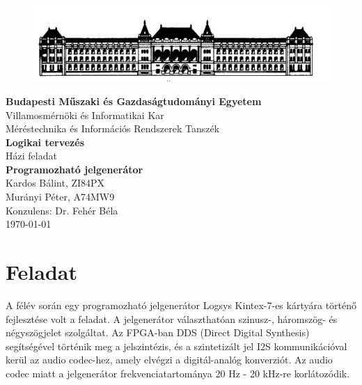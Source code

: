 \documentclass[a4paper,11pt]{article}
\begin{document}
\sloppy

\begin{titlepage}
\begin{center}
\begin{figure}[t!]
	\begin{center}
	\includegraphics[scale=0.2]{bme.png}
	\label{a:bme}
	\end{center}
\end{figure}
\textbf{{Budapesti Műszaki és Gazdaságtudományi Egyetem}}\\
Villamosmérnöki és Informatikai Kar\\
Méréstechnika és Információs Rendszerek Tanszék\\
\vfill
\huge\textbf{{Logikai tervezés}}\\[3mm]
\Large{Házi feladat}\\[3mm]
\Large\textbf{{Programozható jelgenerátor}}\\
\vfill
\Large{Kardos Bálint, ZI84PX}\\
\Large{Murányi Péter, A74MW9}\\
\Large{Konzulens: Dr. Fehér Béla}\\
\vfill
\today \\

\end{center}
\end{titlepage}

\tableofcontents
\thispagestyle{empty}
\clearpage

\setcounter{page}{1}
\setcounter{tocdepth}{4}
\setcounter{secnumdepth}{4}
\setlength{\parindent}{0em}
\setlength{\parskip}{1em}
\section{Feladat}
A félév során egy programozható jelgenerátor Logsys Kintex-7-es kártyára történő fejlesztése volt a feladat. A jelgenerátor választhatóan szinusz-, háromszög- és négyszögjelet szolgáltat. Az FPGA-ban DDS (Direct Digital Synthesis) segítségével történik meg a jelszintézis, és a szintetizált jel I2S kommunikációval kerül az audio codec-hez, amely elvégzi a digitál-analóg konverziót. Az audio codec miatt a jelgenerátor frekvenciatartománya 20 Hz - 20 kHz-re korlátozódik.
\end{document}
